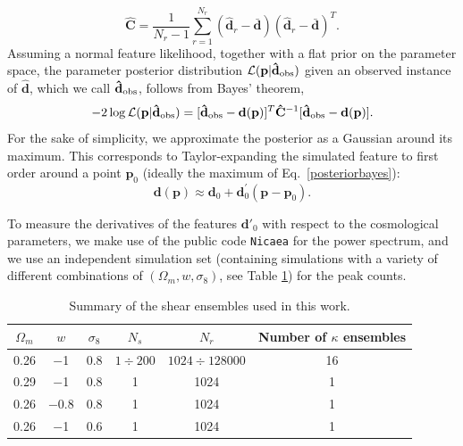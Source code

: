 \documentclass[reprint,aps,prd,superscriptaddress,showkeys,showpacs]{revtex4-1}
\newcommand{\bb}[1]{\mathbf{#1}}
\newcommand{\bbh}[1]{\mathbf{\hat{#1}}}
\begin{document}
\begin{equation}
\label{covest}
\bbh{C} = \frac{1}{N_r-1}\sum_{r=1}^{N_r} (\bbh{d}_r - \bar{\bb{d}}) (\bbh{d}_r - \bar{\bb{d}})^T.
\end{equation}
%
Assuming a normal feature likelihood, together with a flat prior on
the parameter space, the parameter posterior distribution
$\mathcal{L}(\bb{p}\vert\bbh{d}_{\rm obs})$ given an observed instance of
$\bbh{d}$, which we call $\bbh{d}_{\rm obs}$, follows from Bayes' theorem,
%
\begin{equation}
\label{posteriorbayes}
-2\log\mathcal{L}(\bb{p}\vert\bbh{d}_{\rm obs}) = [\bbh{d}_{\rm obs}-\bb{d}(\bb{p})]^T\bbh{C}^{-1}[\bbh{d}_{\rm obs}-\bb{d}(\bb{p})].
\end{equation}
%
For the sake of simplicity, we approximate the posterior as a Gaussian
around its maximum. This corresponds to Taylor-expanding the simulated
feature to first order around a point $\bb{p}_0$ (ideally the maximum
of Eq.~\ref{posteriorbayes}):
%
\begin{equation}
\bb{d}(\bb{p}) \approx \bb{d}_0 + \bb{d}_0^\prime(\bb{p}-\bb{p}_0).
\end{equation}
%

To measure the derivatives of the features $\bb{d}'_0$ with respect to
the cosmological parameters, we make use of the public code
\texttt{Nicaea} \citep{Nicaea} for the power spectrum, and we use an
independent simulation set (containing simulations with a variety of
different combinations of $(\Omega_m,w,\sigma_8)$, see Table
\ref{simtable}) for the peak counts.

\begin{table}
\begin{center}
\begin{tabular}{c|c|c||c|c|c}
\toprule
$\Omega_m$ &  $w$ & $\sigma_8$ & $N_s$ & $N_r$ & Number of $\kappa$ ensembles \\ \hline \hline
\midrule
%
0.26 & $-$1 & 0.8 & $1\div200$ & $1024\div128000$ & 16 \\
0.29 & $-$1 & 0.8 & 1 & 1024 & 1 \\
0.26 & $-$0.8 & 0.8 & 1 & 1024 & 1 \\
0.26 & $-$1 & 0.6 & 1 & 1024 & 1 \\
%
\bottomrule
\end{tabular}
\end{center}
\caption{Summary of the shear ensembles used in this work.}
\label{simtable}
\end{table}
\end{document}
